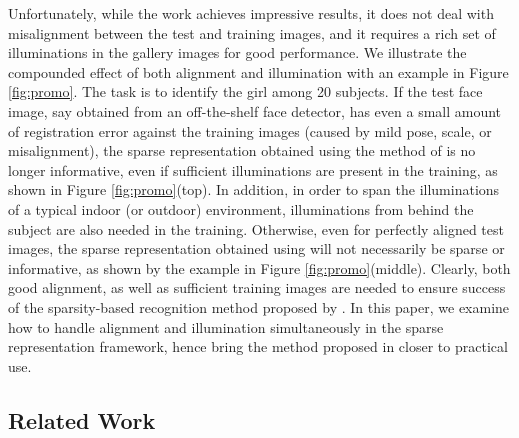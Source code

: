\documentclass[12pt,journal,draftcls,letterpaper,onecolumn]{IEEEtran}
\begin{document}
Unfortunately, while the work \cite{Wright2009-PAMI} achieves impressive results, it does not deal with misalignment
between the test and training images, and it requires a rich set of illuminations
in the gallery images for good performance.  
We illustrate the compounded effect of both alignment and illumination 
with an example in Figure \ref{fig:promo}.
The task is to identify the girl among 20 subjects. If the test
face image, say obtained from an off-the-shelf face detector,
has even a small amount of registration error against the
training images (caused by mild pose, scale, or misalignment),
the sparse representation obtained using the method of \cite{Wright2009-PAMI} is no longer informative, 
even if sufficient illuminations are present in the training, as shown in Figure
\ref{fig:promo}(top). In addition, in order to span
the illuminations of a typical indoor (or outdoor) environment,
illuminations from behind the subject are also needed in the
training. Otherwise, even for perfectly aligned test images,
the sparse representation obtained using \cite{Wright2009-PAMI} will not necessarily be sparse or
informative, as shown by the example in Figure
\ref{fig:promo}(middle). Clearly, both good alignment, as well
as sufficient training images are needed to ensure success of the sparsity-based 
recognition method proposed by \cite{Wright2009-PAMI}.  
In this paper, we examine how to handle alignment and illumination simultaneously
in the sparse representation framework, hence bring the method proposed in \cite{Wright2009-PAMI}
closer to practical use.

\subsection{Related Work}
\end{document}
